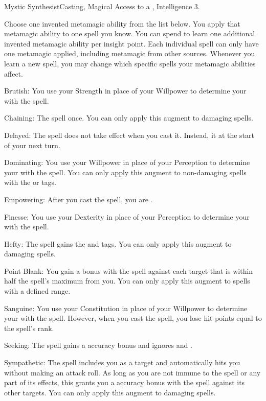   \begin{magicalfeat}{Mystic Synthesist}{Casting, Magical}
    \featpre Access to a , Intelligence 3.

     Choose one invented metamagic ability from the list below.
    You apply that metamagic ability to one spell you know.
    You can spend  to learn one additional invented metamagic ability per insight point.
    Each individual spell can only have one metamagic applied, including metamagic from other sources.
    Whenever you learn a new spell, you may change which specific spells your metamagic abilities affect.
    \begin{raggeditemize}
      \item Brutish: You use your Strength in place of your Willpower to determine your  with the spell.
      \item Chaining: The spell  once.
        You can only apply this augment to  damaging spells.
      \item Delayed: The spell does not take effect when you cast it.
        Instead, it  at the start of your next turn.
      \item Dominating: You use your Willpower in place of your Perception to determine your  with the spell.
        You can only apply this augment to non-damaging spells with the \atCompulsion or \atEmotion tags.
      \item Empowering: After you cast the spell, you are \briefly \empowered.
      \item Finesse: You use your Dexterity in place of your Perception to determine your  with the spell.
      \item Hefty: The spell gains the \atImpact and \atKeen tags.
        You can only apply this augment to damaging spells.
      \item Point Blank: You gain a  bonus with the spell against each target that is within half the spell's maximum  from you.
        You can only apply this augment to  spells with a defined range.
      \item Sanguine: You use your Constitution in place of your Willpower to determine your  with the spell.
        However, when you cast the spell, you lose hit points equal to the spell's rank.
      \item Seeking: The spell gains a  accuracy bonus and ignores  and .
      \item Sympathetic: The spell includes you as a target and automatically hits you without making an attack roll.
        As long as you are not immune to the spell or any part of its effects, this grants you a  accuracy bonus with the spell against its other targets.
        You can only apply this augment to  damaging spells.
    \end{raggeditemize}


\end{magicalfeat}
